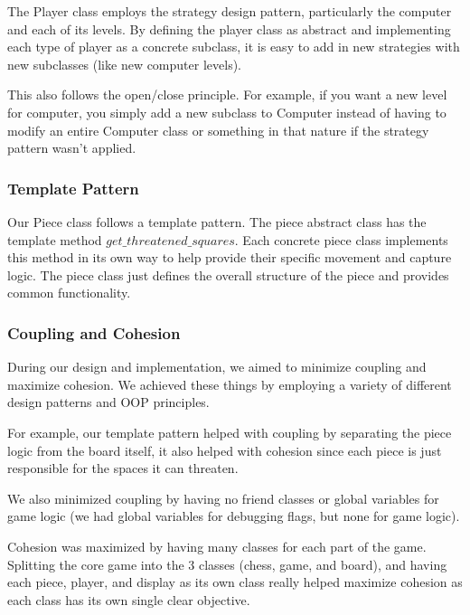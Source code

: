 \documentclass[12pt]{article}
\begin{document}
The Player class employs the strategy design pattern,
particularly the computer and each of its levels. By
defining the player class as abstract and implementing 
each type of player as a concrete subclass, it is easy
to add in new strategies with new subclasses (like
new computer levels).

\bigskip

This also follows the open/close principle. For example, if you want
a new level for computer, you simply add a new subclass
to Computer instead of having to modify an 
entire Computer class or something in that nature if
the strategy pattern wasn't applied.

\subsubsection*{Template Pattern}

Our Piece class follows a template pattern.
The piece abstract class has the template method
$get\_threatened\_squares$. Each concrete
piece class implements this method in
its own way to help provide their specific
movement and capture logic. The piece class
just defines the overall structure of the piece
and provides common functionality.

\subsubsection*{Coupling and Cohesion}

During our design and implementation, we aimed
to minimize coupling and maximize cohesion. We
achieved these things by employing a variety of 
different design patterns and OOP principles. 

\bigskip

For example, our template pattern
helped with coupling by separating
the piece logic from the board itself, it
also helped with cohesion since each
piece is just responsible for the spaces
it can threaten. 

\bigskip

We also minimized coupling by having no friend
classes or global variables for game logic 
(we had global variables for debugging flags,
but none for game logic).

\bigskip

Cohesion was maximized by having many classes
for each part of the game. Splitting the core
game into the 3 classes (chess, game, and board), 
and having each piece, player, and display
as its own class really helped maximize cohesion
as each class has its own single clear objective.
\end{document}
